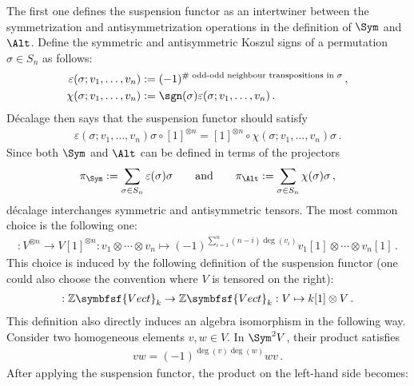 \begin{remark}
        The first one defines the suspension functor as an intertwiner between the symmetrization and antisymmetrization operations in the definition of $\Sym$ and $\Alt$. Define the symmetric and antisymmetric Koszul signs of a permutation $\sigma\in S_n$ as follows:
        \begin{align}
            \varepsilon(\sigma;v_1,\ldots,v_n) &:= (-1)^{\#\text{ odd-odd neighbour transpositions in }\sigma}\,,\\
            \chi(\sigma;v_1,\ldots,v_n) &:= \sgn(\sigma)\varepsilon(\sigma;v_1,\ldots,v_n)\,.
        \end{align}
        D\'ecalage then says that the suspension functor should satisfy
        \begin{gather}
            \varepsilon(\sigma;v_1,\ldots,v_n)\sigma\circ[1]^{\otimes n} = [1]^{\otimes n}\circ\chi(\sigma;v_1,\ldots,v_n)\sigma\,.
        \end{gather}
        Since both $\Sym$ and $\Alt$ can be defined in terms of the projectors
        \begin{gather}
            \pi_{\Sym}:=\sum_{\sigma\in S_n}\varepsilon(\sigma)\sigma\qquad\text{and} \qquad \pi_{\Alt}:=\sum_{\sigma\in S_n}\chi(\sigma)\sigma\,,
        \end{gather}
        d\'ecalage interchanges symmetric and antisymmetric tensors. The most common choice is the following one:
        \begin{gather}
            [1]:V^{\otimes n}\rightarrow V[1]^{\otimes n}:v_1\otimes\cdots\otimes v_n\mapsto(-1)^{\sum_{i=1}^n(n-i)\deg(v_i)}v_1[1]\otimes\cdots\otimes v_n[1]\,.
        \end{gather}
        This choice is induced by the following definition of the suspension functor (one could also choose the convention where $V$ is tensored on the right):
        \begin{gather}
            [1]:\mathbb{Z}\symbfsf{Vect}_k\rightarrow\mathbb{Z}\symbfsf{Vect}_k:V\mapsto k[1]\otimes V\,.
        \end{gather}
        This definition also directly induces an algebra isomorphism in the following way. Consider two homogeneous elements $v,w\in V$. In $\Sym^2V$, their product satisfies
        \begin{gather}
            vw = (-1)^{\deg(v)\deg(w)}wv\,.
        \end{gather}
        After applying the suspension functor, the product on the left-hand side becomes:
        \begin{gather}

\end{gather}
\end{remark}
